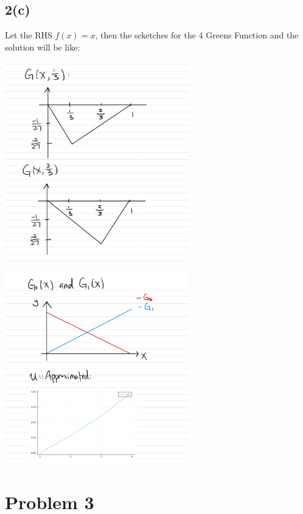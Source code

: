 \documentclass[]{article}
\begin{document}
    \subsection*{2(c)}
    Let the RHS $f(x) = x$, then the scketches for the 4 Greens Function and the solution will be like: 
    \begin{center}
        \includegraphics[width=8cm]{green_sketch1.jpeg}
    \includegraphics[width=8cm]{green_sketch2.jpeg}    
    \end{center}
    
\section*{Problem 3}
\end{document}
